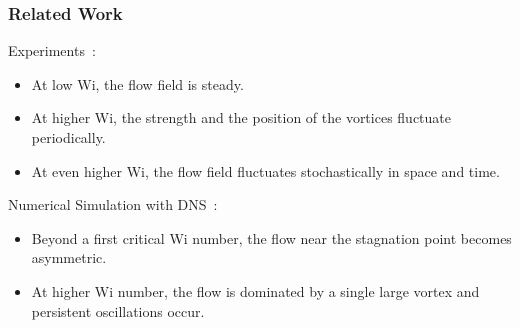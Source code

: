 \begin{frame}
  \frametitle{Related Work}
  \begin{block}{Experiments~\footnotemark[1]:}
    \begin{itemize}
    \item  At low Wi, the flow field is steady. 
    \item At higher Wi, the strength and the position of the vortices fluctuate periodically.
    \item At even higher Wi, the flow field fluctuates stochastically in space and time.
    \end{itemize}
  \end{block}
  \begin{block}{Numerical Simulation with DNS~\footnotemark[2]: }
    \begin{itemize}
    \item Beyond a first critical Wi number, the flow near the stagnation point becomes asymmetric.
    \item At higher Wi number, the flow is dominated by a single large vortex and persistent oscillations occur. 
    \end{itemize}
  \end{block}
\end{frame}

